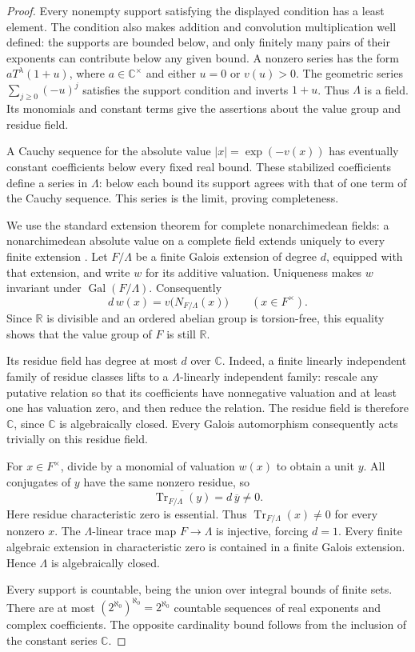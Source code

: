 \documentclass[11pt]{article}
\numberwithin{equation}{section}
\theoremstyle{definition}
\theoremstyle{remark}
\newcommand{\C}{\mathbb C}
\newcommand{\R}{\mathbb R}
\begin{document}
\begin{proof}
Every nonempty support satisfying the displayed condition has a least
element.  The condition also makes addition and convolution
multiplication well defined: the supports are bounded below, and only
finitely many pairs of their exponents can contribute below any given
bound.  A nonzero series has the form $aT^\lambda(1+u)$, where
$a\in\C^\times$ and either $u=0$ or $v(u)>0$.  The geometric series
$\sum_{j\ge0}(-u)^j$ satisfies the support condition and inverts $1+u$.
Thus $\Lambda$ is a field.  Its monomials and constant terms give the
assertions about the value group and residue field.

A Cauchy sequence for the absolute value $|x|=\exp(-v(x))$ has eventually
constant coefficients below every fixed real bound.  These stabilized
coefficients define a series in $\Lambda$: below each bound its support
agrees with that of one term of the Cauchy sequence.  This series is the
limit, proving completeness.

We use the standard extension theorem for complete nonarchimedean
fields: a nonarchimedean absolute value on a complete field extends
uniquely to every finite extension
\cite[Theorem~6.4]{Field:ConradAbsoluteValues}.
Let $F/\Lambda$ be a finite Galois extension of degree $d$, equipped
with that extension, and write $w$ for its additive valuation.  Uniqueness
makes $w$ invariant under $\operatorname{Gal}(F/\Lambda)$.  Consequently
\[
 d\,w(x)=v\bigl(N_{F/\Lambda}(x)\bigr)
 \qquad(x\in F^\times).
\]
Since $\R$ is divisible and an ordered abelian group is torsion-free,
this equality shows that the value group of $F$ is still $\R$.

Its residue field has degree at most $d$ over $\C$.  Indeed, a finite
linearly independent family of residue classes lifts to a
$\Lambda$-linearly independent family: rescale any putative relation
so that its coefficients have nonnegative valuation and at least one
has valuation zero, and then reduce the relation.  The residue field
is therefore $\C$, since $\C$ is algebraically closed.  Every Galois
automorphism consequently acts trivially on this residue field.

For $x\in F^\times$, divide by a monomial of valuation $w(x)$ to obtain
a unit $y$.  All conjugates of $y$ have the same nonzero residue, so
\[
 \overline{\operatorname{Tr}_{F/\Lambda}(y)}
       =d\,\overline y\ne0.
\]
Here residue characteristic zero is essential.  Thus
$\operatorname{Tr}_{F/\Lambda}(x)\ne0$ for every nonzero $x$.
The $\Lambda$-linear trace map $F\to\Lambda$ is injective, forcing
$d=1$.  Every finite algebraic extension in characteristic zero is
contained in a finite Galois extension.  Hence $\Lambda$ is
algebraically closed.

Every support is countable, being the union over integral bounds of
finite sets.  There are at most
$(2^{\aleph_0})^{\aleph_0}=2^{\aleph_0}$ countable sequences of real
exponents and complex coefficients.  The opposite cardinality bound
follows from the inclusion of the constant series $\C$.
\end{proof}
\end{document}
